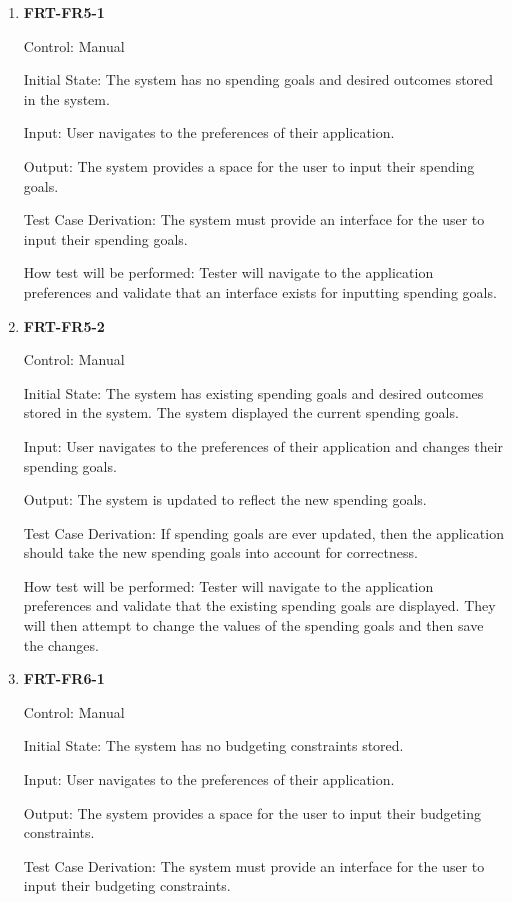 \documentclass[12pt, titlepage]{article}
\begin{document}
\begin{enumerate}

\item{\textbf{FRT-FR5-1}}

Control: Manual
          
Initial State: The system has no spending goals and desired outcomes stored in the system.

Input: User navigates to the preferences of their application.
          
Output: The system provides a space for the user to input their spending goals.

Test Case Derivation: The system must provide an interface for the user to input their spending goals.
          
How test will be performed: Tester will navigate to the application preferences and validate that an interface exists for inputting spending goals.

\item{\textbf{FRT-FR5-2}}

Control: Manual
          
Initial State: The system has existing spending goals and desired outcomes stored in the system. The system displayed the current spending goals.

Input: User navigates to the preferences of their application and changes their spending goals.
          
Output: The system is updated to reflect the new spending goals.

Test Case Derivation: If spending goals are ever updated, then the application should take the new spending goals into account
for correctness.
          
How test will be performed: Tester will navigate to the application preferences and validate that the existing spending goals are displayed. They will then attempt to change the values of the spending goals and then save the changes.

\item{\textbf{FRT-FR6-1}}

Control: Manual
          
Initial State: The system has no budgeting constraints stored.

Input: User navigates to the preferences of their application.
          
Output: The system provides a space for the user to input their budgeting constraints.

Test Case Derivation: The system must provide an interface for the user to input their budgeting constraints.
          

\end{enumerate}
\end{document}
